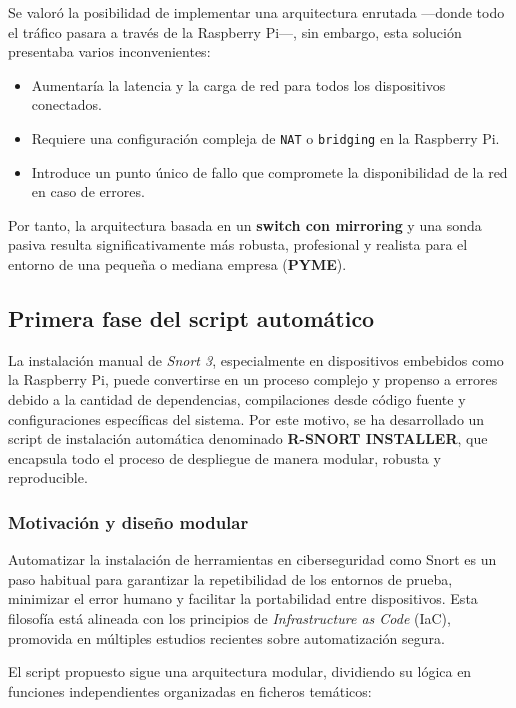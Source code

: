 \documentclass[11pt,a4paper,twoside]{report}
\begin{document}
Se valoró la posibilidad de implementar una arquitectura enrutada —donde todo el tráfico pasara a través de la Raspberry Pi—, sin embargo, esta solución presentaba varios inconvenientes:

\begin{itemize}
	\item Aumentaría la latencia y la carga de red para todos los dispositivos conectados.
	\item Requiere una configuración compleja de \texttt{NAT} o \texttt{bridging} en la Raspberry Pi.
	\item Introduce un punto único de fallo que compromete la disponibilidad de la red en caso de errores.
\end{itemize}

Por tanto, la arquitectura basada en un \textbf{switch con mirroring} y una sonda pasiva resulta significativamente más robusta, profesional y realista para el entorno de una pequeña o mediana empresa (\textbf{PYME}).


\subsection{Primera fase del script automático}
La instalación manual de \textit{Snort 3}, especialmente en dispositivos embebidos como la Raspberry Pi, puede convertirse en un proceso complejo y propenso a errores debido a la cantidad de dependencias, compilaciones desde código fuente y configuraciones específicas del sistema. Por este motivo, se ha desarrollado un script de instalación automática denominado \textbf{R-SNORT INSTALLER}, que encapsula todo el proceso de despliegue de manera modular, robusta y reproducible.

\subsubsection{Motivación y diseño modular}

Automatizar la instalación de herramientas en ciberseguridad como Snort es un paso habitual para garantizar la repetibilidad de los entornos de prueba, minimizar el error humano y facilitar la portabilidad entre dispositivos. Esta filosofía está alineada con los principios de \textit{Infrastructure as Code} (IaC), promovida en múltiples estudios recientes sobre automatización segura.
\newline

El script propuesto sigue una arquitectura modular, dividiendo su lógica en funciones independientes organizadas en ficheros temáticos:
\end{document}
